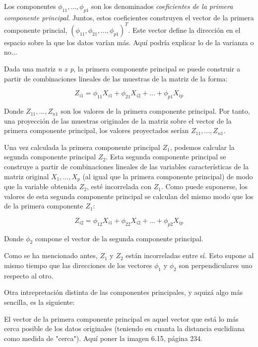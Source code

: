 \documentclass[12pt,a4paper,Spanish]{book}
\begin{document}
Los componentes $\phi_{11},...,\phi_{p1}$ son los denominados \textit{coeficientes de la primera componente principal}. Juntos, estos coeficientes construyen el vector de la primera componente princial, $(\phi_{11}, \phi_{21},...,\phi_{p1})^T$. Este vector define la dirección en el espacio sobre la que los datos varían más. Aquí podría explicar lo de la varianza o no...

Dada una matriz \textit{n x p}, la primera componente principal se puede construir a partir de combinaciones lineales de las muestras de la matriz de la forma:

\begin{equation}
Z_{i1}=\phi_{11}X_{i1} + \phi_{21}X_{i2} + ... + \phi_{p1}X_{ip}
\end{equation}

Donde $Z_{11},...,Z_{n1}$ son los valores de la primera componente principal. Por tanto, una proyección de las muestras originales de la matriz sobre el vector de la primera componente principal, los valores proyectados serían $Z_{11},...,Z_{n1}$. 

Una vez calculada la primera componente principal $Z_1$, podemos calcular la segunda componente principal $Z_2$. Esta segunda componente principal se construye a partir de combinaciones lineales de las variables características de la matriz original $X_1,...,X_p$ (al igual que la primera componente principal) de modo que la variable obtenida $Z_2$, esté incorrelada con $Z_1$. Como puede suponerse, los valores de esta segunda componente principal se calculan del mismo modo que los de la primera componente $Z_1$:

\begin{equation}
Z_{i2}=\phi_{12}X_{i1} + \phi_{22}X_{i2} + ... + \phi_{p2}X_{ip}
\end{equation}

Donde $\phi_{2}$ compone el vector de la segunda componente principal.

Como se ha mencionado antes, $Z_1$ y $Z_2$ están incorreladas entre sí. Esto supone al mismo tiempo que las direcciones de los vectores $\phi_{1}$ y $\phi_{2}$ son perpendiculares uno respecto al otro.

Otra intrepretación distinta de las componentes principales, y aquizá algo más sencilla, es la siguiente:

El vector de la primera componente principal es aquel vector que está lo más cerca posible de los datos originales (teniendo en cuanta la distancia euclidiana como medida de "cerca"). Aquí poner la imagen 6.15, página 234.
\end{document}
